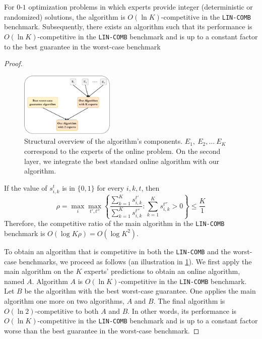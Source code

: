\begin{corollary} \label{corollary}
	For $0$-$1$ optimization problems in which experts provide integer (deterministic or randomized) solutions,
	the algorithm is $O(\ln K)$-competitive in the \texttt{LIN-COMB} benchmark.
	Subsequently, there exists an algorithm such that its performance is $O(\ln K)$-competitive in the \texttt{LIN-COMB}
	benchmark and is up to a constant factor to the best guarantee in the worst-case benchmark
\end{corollary}
%
\begin{proof}

\begin{figure}
 \vspace{-0.9cm}
  \begin{center}
    \includegraphics[width=0.4\textwidth]{../paper/Img/algo_structure.pdf}
  \end{center}
  \vspace{-0.5cm}
      \caption{Structural overview of the algorithm's components. $E_1,\ E_2, \dots\ E_K$ correspond to the experts of the online problem.
      On the second layer, we integrate the best standard online algorithm with our algorithm. }
  \label{fig:algo-layers}
   \vspace{-0.8cm}
\end{figure}

	If the value of $s_{i,k}^{t}$ is in $\{0,1\}$ for every $i,k,t$, then
	\[
	\rho = \max_{i} \max_{t',t''} \left\{\frac{\sum_{k=1}^{K} s_{i,k}^{t'}}{\sum_{k=1}^{K} s_{i,k}^{t''}} : \sum_{k=1}^{K} s_{i,k}^{t''} > 0 \right\}
	\leq \frac{K}{1}
	\]
	Therefore, the competitive ratio of the main algorithm in the \texttt{LIN-COMB} benchmark is $O(\log K \rho) = O(\log K^2)$.

 	To obtain an algorithm that is competitive in both the \texttt{LIN-COMB} and the worst-case benchmarks, we proceed as follows (an illustration in \cref{fig:algo-layers}).
	We first apply the main algorithm on the $K$ experts' predictions to obtain an online algorithm, named $A$.
	Algorithm $A$ is $O(\ln K)$-competitive in the \texttt{LIN-COMB} benchmark. Let $B$ be the algorithm with the best worst-case guarantee.
	One applies the main algorithm one more on two algorithms, $A$ and $B$. The final algorithm is $O(\ln 2)$-competitive to both $A$ and $B$.
	In other words, its performance is $O(\ln K)$-competitive in the \texttt{LIN-COMB} benchmark and is up to a constant factor worse than the best guarantee in the worst-case benchmark.

\end{proof}

